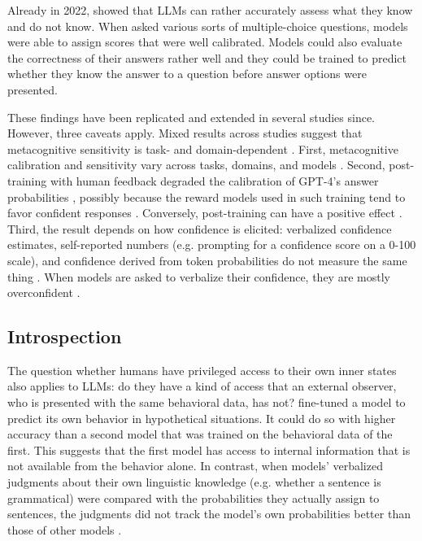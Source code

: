 Already in 2022, \citet{kadavath2022language} showed that LLMs can rather accurately assess what they know and do not know. When asked various sorts of multiple-choice questions, models were able to assign scores that were well calibrated. Models could also evaluate the correctness of their answers rather well and they could be trained to predict whether they know the answer to a question before answer options were presented.

These findings have been replicated and extended in several studies since. However, three caveats apply. Mixed results across studies suggest that metacognitive sensitivity is task- and domain-dependent \citep{liu2026metacog}. First, metacognitive calibration and sensitivity vary across tasks, domains, and models \citep{liu2026metacog}. Second, post-training with human feedback degraded the calibration of GPT-4's answer probabilities \citep{openai2024gpt4}, possibly because the reward models used in such training tend to favor confident responses \citep{leng2025taming}. Conversely,  post-training can have a positive effect \citep{lindsey2025introspection}. Third, the result depends on how confidence is elicited: verbalized confidence estimates, self-reported numbers (e.g. prompting for a confidence score on a 0-100 scale), and confidence derived from token probabilities do not measure the same thing \citep{liu2026metacog}. When models are asked to verbalize their confidence, they are mostly overconfident \citep{xiong2024can}.

\subsection{Introspection}
The question whether humans have privileged access to their own inner states also applies to LLMs: do they have a kind of access that an external observer, who is presented with the same behavioral data, has not? \citet{binder2024looking} fine-tuned a model to predict its own behavior in hypothetical situations. It could do so with higher accuracy than a second model that was trained on the behavioral data of the first. This suggests that the first model has access to internal information that is not available from the behavior alone. In contrast, when models' verbalized judgments about their own linguistic knowledge (e.g. whether a sentence is grammatical) were compared with the probabilities they actually assign to sentences, the judgments did not track the model's own probabilities better than those of other models \citep{song2025languagemodelsfailintrospect}. 

